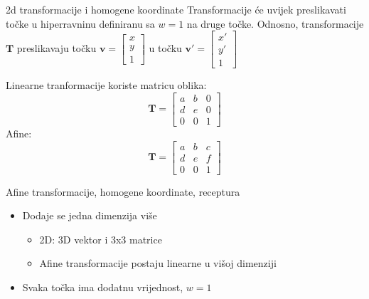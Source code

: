 \documentclass[9pt]{beamer}
\begin{document}
\begin{frame}{2d transformacije i homogene koordinate }
	Transformacije će uvijek preslikavati točke u hiperravninu definiranu sa $w = 1$ na druge točke.
	Odnosno, transformacije $\mathbf{T}$ preslikavaju točku 
	$\mathbf{v} = \left[ \begin{array}{c} x \\ y \\ 1 \end{array} \right]$ u točku
	$\mathbf{v'} = \left[ \begin{array}{c} x' \\ y' \\ 1 \end{array} \right]$
	
	Linearne tranformacije koriste matricu oblika:
	\begin{equation}
	\mathbf{T} = 
	\left[ \begin{array}{ccc}
	a & b & 0\\
	d & e & 0 \\
	0 & 0 & 1 \end{array} \right] 
	\nonumber
	\end{equation}
	Afine: 
	\begin{equation}
	\mathbf{T} = 
	\left[ \begin{array}{ccc}
	a & b & c\\
	d & e & f \\
	0 & 0 & 1 \end{array} \right] 
	\nonumber
	\end{equation}
\end{frame}


\begin{frame}{Afine transformacije, homogene koordinate, receptura}
	\begin{itemize}
		\item Dodaje se jedna dimenzija više
		\begin{itemize}
			\item 2D: 3D vektor i 3x3 matrice
			\item Afine transformacije postaju linearne u višoj dimenziji
		\end{itemize}
		\item Svaka točka ima dodatnu vrijednost, $w=1$		
	\end{itemize}
\end{frame}


\end{document}
